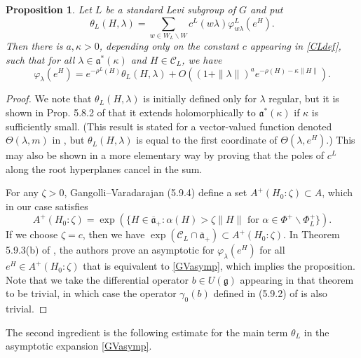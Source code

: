 \documentclass[12pt]{amsart}
\newtheorem{prop}[theorem]{Proposition}
\theoremstyle{remark}
\newcommand{\g}{\mathfrak g}
\newcommand{\ga}{\mathfrak a}
\newcommand{\be}{\begin{equation}}
\newcommand{\ee}{\end{equation}}
\begin{document}
\begin{prop}\label{lem:complexGV}
Let $L$ be a standard Levi subgroup of $G$ and put
\[
\theta_L(H, \lambda)= \sum_{w \in W_L \backslash W} c^L(w \lambda) \varphi^L_{w \lambda}(e^H).
\]
Then there is $a,\kappa >0$, depending only on the constant $c$ appearing in \eqref{CLdef}, such that for all $\lambda \in \ga^*(\kappa)$ and $H \in \mathcal{C}_L$, we have 
\be
\label{GVasymp}
\varphi_\lambda(e^H)= e^{-\rho^L(H) } \theta_L(H, \lambda)+O((1 + \| \lambda \|)^a e^{-\rho(H)  - \kappa \| H \|} ).
\ee
\end{prop}

\begin{proof}
We note that $\theta_L(H, \lambda)$ is initially defined only for $\lambda$ regular, but it is shown in Prop. 5.8.2 of \cite{Gangolli_Varadarajan_88} that it extends holomorphically to $\ga^*(\kappa)$ if $\kappa$ is sufficiently small.  (This result is stated for a vector-valued function denoted $\Theta(\lambda,m)$ in \cite{Gangolli_Varadarajan_88}, but $\theta_L(H, \lambda)$ is equal to the first coordinate of $\Theta(\lambda,e^H)$.)  This may also be shown in a more elementary way by proving that the poles of $c^L$ along the root hyperplanes cancel in the sum.

For any $\zeta > 0$, Gangolli--Varadarajan \cite{Gangolli_Varadarajan_88} (5.9.4) define a set $A^+(H_0:\zeta) \subset A$, which in our case satisfies
\[
A^+(H_0:\zeta) = \exp( \{ H \in \overline{\ga}_+ : \alpha(H) > \zeta \| H \| \text{ for } \alpha \in \Phi^+ \smallsetminus \Phi^+_L \} ).
\]
If we choose $\zeta = c$, then we have $\exp( \mathcal{C}_L \cap \overline{\ga}_+) \subset A^+(H_0:\zeta)$.  In Theorem 5.9.3(b) of \cite{Gangolli_Varadarajan_88}, the authors prove an asymptotic for $\varphi_\lambda(e^H)$ for all $e^H \in A^+(H_0:\zeta)$ that is equivalent to \eqref{GVasymp}, which implies the proposition.  Note that we take the differential operator $b \in U(\g)$ appearing in that theorem to be trivial, in which case the operator $\gamma_0(b)$ defined in (5.9.2) of \cite{Gangolli_Varadarajan_88} is also trivial.
\end{proof}

The second ingredient is the following estimate for the main term $\theta_L$ in the asymptotic expansion \eqref{GVasymp}.
\end{document}
